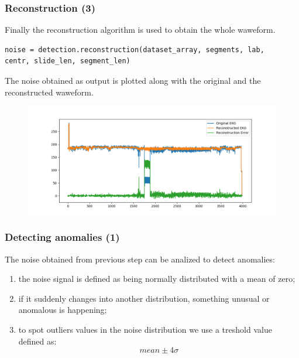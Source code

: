 \documentclass[xcolor ={table,usenames,dvipsnames}]{beamer}
\theoremstyle{definition}
\begin{document}
	\begin{frame}[fragile]
		\frametitle{Reconstruction (3)}
		Finally the reconstruction algorithm is used to obtain the whole waweform. 
		
		\begin{lstlisting}
noise = detection.reconstruction(dataset_array, segments, lab, 
centr, slide_len, segment_len)
		\end{lstlisting}
		The noise obtained as output is plotted along with the original and the reconstructed waweform.
		
		\begin{figure}[h!]
			\centering
			\includegraphics[scale=0.3]{img/noise.png}
		\end{figure}
	\end{frame}

	\begin{frame}
		\frametitle{Detecting anomalies (1)}
		The noise obtained from previous step can be analized to detect anomalies:
		\begin{enumerate}
			\item the noise signal is defined as being normally distributed with a mean of zero;
			\item if it suddenly changes into another distribution, something unusual or anomalous is happening;
			\item to spot outliers values in the noise distribution we use a treshold value defined as:
				$$ mean \pm 4\sigma $$
		\end{enumerate}
	\end{frame}
\end{document}
